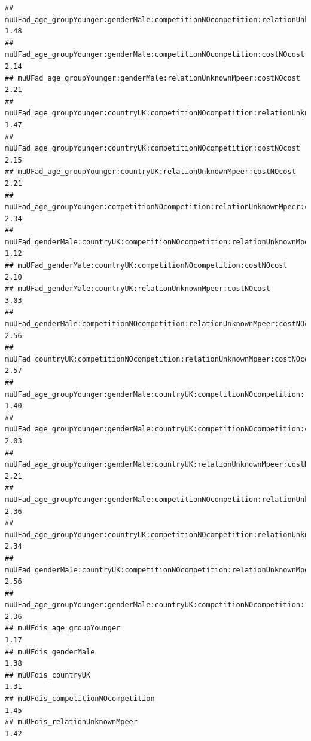 \documentclass[
]{article}
\begin{document}
\begin{verbatim}
## muUFad_age_groupYounger:genderMale:competitionNOcompetition:relationUnknownMpeer                       1.48
## muUFad_age_groupYounger:genderMale:competitionNOcompetition:costNOcost                                 2.14
## muUFad_age_groupYounger:genderMale:relationUnknownMpeer:costNOcost                                     2.21
## muUFad_age_groupYounger:countryUK:competitionNOcompetition:relationUnknownMpeer                        1.47
## muUFad_age_groupYounger:countryUK:competitionNOcompetition:costNOcost                                  2.15
## muUFad_age_groupYounger:countryUK:relationUnknownMpeer:costNOcost                                      2.21
## muUFad_age_groupYounger:competitionNOcompetition:relationUnknownMpeer:costNOcost                       2.34
## muUFad_genderMale:countryUK:competitionNOcompetition:relationUnknownMpeer                              1.12
## muUFad_genderMale:countryUK:competitionNOcompetition:costNOcost                                        2.10
## muUFad_genderMale:countryUK:relationUnknownMpeer:costNOcost                                            3.03
## muUFad_genderMale:competitionNOcompetition:relationUnknownMpeer:costNOcost                             2.56
## muUFad_countryUK:competitionNOcompetition:relationUnknownMpeer:costNOcost                              2.57
## muUFad_age_groupYounger:genderMale:countryUK:competitionNOcompetition:relationUnknownMpeer             1.40
## muUFad_age_groupYounger:genderMale:countryUK:competitionNOcompetition:costNOcost                       2.03
## muUFad_age_groupYounger:genderMale:countryUK:relationUnknownMpeer:costNOcost                           2.21
## muUFad_age_groupYounger:genderMale:competitionNOcompetition:relationUnknownMpeer:costNOcost            2.36
## muUFad_age_groupYounger:countryUK:competitionNOcompetition:relationUnknownMpeer:costNOcost             2.34
## muUFad_genderMale:countryUK:competitionNOcompetition:relationUnknownMpeer:costNOcost                   2.56
## muUFad_age_groupYounger:genderMale:countryUK:competitionNOcompetition:relationUnknownMpeer:costNOcost  2.36
## muUFdis_age_groupYounger                                                                               1.17
## muUFdis_genderMale                                                                                     1.38
## muUFdis_countryUK                                                                                      1.31
## muUFdis_competitionNOcompetition                                                                       1.45
## muUFdis_relationUnknownMpeer                                                                           1.42

\end{verbatim}
\end{document}
